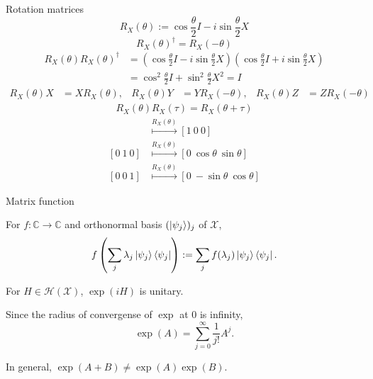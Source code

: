 \documentclass{beamer}
\begin{document}
\begin{frame}{Rotation matrices}
\begin{equation*}
R_X(\theta) := \cos\frac{\theta}2 I - i \sin\frac{\theta}2 X
\end{equation*}
\begin{equation*}
R_X(\theta)^\dagger = R_X(-\theta)
\end{equation*}
\begin{align*}
R_X(\theta)R_X(\theta)^\dagger &= (\cos\frac{\theta}2 I - i \sin\frac{\theta}2 X)(\cos\frac{\theta}2 I + i \sin\frac{\theta}2 X)\\
&= \cos^2\frac{\theta}2 I + \sin^2\frac{\theta}2 X^2=I
\end{align*}
\begin{align*}
R_X(\theta)X&=X R_X(\theta),&
R_X(\theta)Y&=Y R_X(-\theta),&
R_X(\theta)Z&=Z R_X(-\theta)
\end{align*}
\begin{align*}
R_X(\theta)R_X(\tau)=R_X(\theta+\tau)
\end{align*}
\begin{align*}
[1\  0\  0]&\overset{R_X(\theta)}{\longmapsto} [1\ 0\ 0]\\
[0\  1\  0]&\overset{R_X(\theta)}{\longmapsto} [0\ \cos\theta\ \sin\theta]\\
[0\  0\  1]&\overset{R_X(\theta)}{\longmapsto} [0\ -\sin\theta\ \cos\theta]
\end{align*}
\end{frame}

\begin{frame}{Matrix function}
\begin{definition}
For $f\colon \mathbb{C}\to\mathbb{C}$ and orthonormal basis $(\ket{\psi_j})_j$ of $\mathcal{X}$,
\begin{equation*}
f\left(\sum_j \lambda_j \ket{\psi_j}\bra{\psi_j}\right) := \sum_j f(\lambda_j) \ket{\psi_j}\bra{\psi_j}.
\end{equation*}
\end{definition}
For $H\in\mathcal{H}(\mathcal{X})$,
$\exp(iH)$ is unitary.

\vspace{2em}
Since the radius of convergense of $\exp$ at 0 is infinity,
\begin{equation*}
\exp(A) = \sum_{j=0}^\infty \frac1{j!}A^j.
\end{equation*}

\vspace{1em}
In general, $\exp(A+B)\ne\exp(A)\exp(B)$.
\end{frame}
\end{document}
